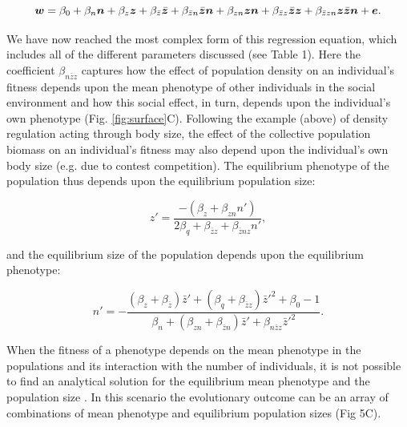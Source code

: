 \documentclass{article}
\begin{document}
\begin{equation} 
\vectorsym{w}=\beta_{0} +\beta_{n} \vectorsym{n} + \beta_{z} \vectorsym{z}+ \beta_{\bar{z}} \vectorsym{\bar{z}}  +   \beta_{\bar{z}n} \vectorsym{\bar{z}n} +   \beta_{zn} \vectorsym{zn} + \beta_{\bar{z}z} \vectorsym{\bar{z}z}   +   \beta_{\bar{z}zn} \vectorsym{z\bar{z}n} + \vectorsym{e}.
\end{equation}

\noindent We have now reached the most complex form of this regression equation, which includes all of the different parameters discussed (see Table 1). Here the coefficient $\beta_{n\bar{z}z}$ captures how the effect of population density on an individual's fitness depends upon the mean phenotype of other individuals in the social environment and how this social effect, in turn, depends upon the individual's own phenotype (Fig. \ref{fig:surface}C). Following the example (above) of density regulation acting through body size, the effect of the collective population biomass on an individual's fitness may also depend upon the individual's own body size (e.g. due to contest competition). The equilibrium phenotype of the population thus depends upon the equilibrium population size: 

\begin{equation} 
z'=\frac{-(\beta_{z}+\beta_{zn}n')}{2\beta_{q} + \beta_{\bar{z}z} + \beta_{\bar{z}nz}n'},
\end{equation} 

\noindent and the equilibrium size of the population depends upon the equilibrium phenotype:

\begin{equation}  \label{eq: full}
	n' = -\frac{(\beta_{z}  +  \beta_{\bar{z}})\bar{z}' + (\beta_{q} + \beta_{\bar{z}z})\bar{z}'^2 +\beta_{0} -1}{\beta_{n} + (\beta_{zn} + \beta_{\bar{z}n}) \bar{z}' +  \beta_{n\bar{z}z}\bar{z}'^2}.
\end{equation}

When the fitness of a phenotype depends on the mean phenotype in the populations and its interaction with the number of individuals, it is not possible to find an analytical solution for the equilibrium mean phenotype and the population size \citep{Engen2020}. In this scenario the evolutionary outcome can be an array of combinations of mean phenotype and equilibrium population sizes (Fig 5C).
\end{document}
